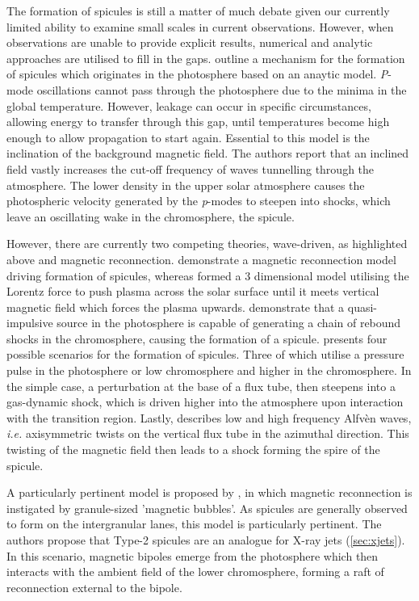 The formation of spicules is still a matter of much debate given our currently limited ability to examine small scales in current observations. 
However, when observations are unable to provide explicit results, numerical and analytic approaches are utilised to fill in the gaps.
\cite{DePointeu2004} outline a mechanism for the formation of spicules which originates in the photosphere based on an anaytic model.
\emph{P}-mode oscillations cannot pass through the photosphere due to the minima in the global temperature.
However, leakage can occur in specific circumstances, allowing energy to transfer through this gap, until temperatures become high enough to allow propagation to start again.
Essential to this model is the inclination of the background magnetic field.
The authors report that an inclined field vastly increases the cut-off frequency of waves tunnelling through the atmosphere. 
The lower density in the upper solar atmosphere causes the photospheric velocity generated by the \emph{p}-modes to steepen into shocks, which leave an oscillating wake in the chromosphere, the spicule.

However, there are currently two competing theories, wave-driven, as highlighted above and magnetic reconnection.
\cite{Takeuchi2001} demonstrate a magnetic reconnection model driving formation of spicules, whereas \cite{Martinez2011} formed a $3$ dimensional model utilising the Lorentz force to push plasma across the solar surface until it meets vertical magnetic field which forces the plasma upwards.
\cite{Hollweg1982} demonstrate that a quasi-impulsive source in the photosphere is capable of generating a chain of rebound shocks in the chromosphere, causing the formation of a spicule.
\cite{Sterling2000} presents four possible scenarios for the formation of spicules.
Three of which utilise a pressure pulse in the photosphere or low chromosphere and higher in the chromosphere. 
In the simple case, a perturbation at the base of a flux tube, then steepens into a gas-dynamic shock, which is driven higher into the atmosphere upon interaction with the transition region.
Lastly, \cite{Sterling2000} describes low and high frequency Alfv{\`e}n waves, \emph{i.e.} axisymmetric twists on the vertical flux tube in the azimuthal direction.
This twisting of the magnetic field then leads to a shock forming the spire of the spicule.

A particularly pertinent model is proposed by \cite{Moore2011spic_recon}, in which magnetic reconnection is instigated by granule-sized 'magnetic bubbles'.
As spicules are generally observed to form on the intergranular lanes, this model is particularly pertinent. 
The authors propose that Type-2 spicules are an analogue for X-ray jets (\ref{sec:xjets}).
In this scenario, magnetic bipoles emerge from the photosphere which then interacts with the ambient field of the lower chromosphere, forming a raft of reconnection external to the bipole. 

